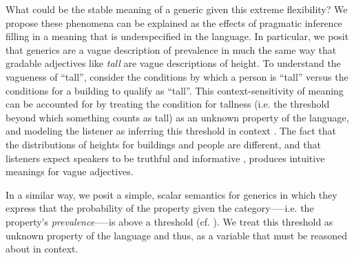 \documentclass[10pt,letterpaper]{article}
\begin{document}
What could be the stable meaning of a generic given this extreme flexibility? 
We propose these phenomena can be explained as the effects of pragmatic inference filling in a meaning that is underspecified in the language. 
%
In particular, we posit that generics are a vague description of prevalence in much the same way that gradable adjectives like \emph{tall} are vague descriptions of height. 
To understand the vagueness of ``tall'', consider the conditions by which a person is ``tall'' versus the conditions for a building to qualify as ``tall''.
This context-sensitivity of meaning can be accounted for by treating the condition for tallness (i.e. the threshold beyond which something counts as tall) as an unknown property of the language, and modeling the listener as inferring this threshold in context \cite{Lassiter2015}. 
The fact that the distributions of heights for buildings and people are different, and that listeners expect speakers to be truthful and informative \cite{Clark1996, Grice1975, Levinson2000}, produces intuitive meanings for vague adjectives.
 

In a similar way, we posit a simple, scalar semantics for generics in which they express that the probability of the property given the category-----i.e. the property's \emph{prevalence}-----is above a threshold (cf. ). We treat this threshold as unknown property of the language and thus, as a variable that must be reasoned about in context. 
\end{document}
